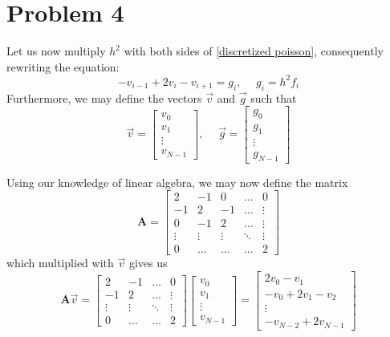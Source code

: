 \documentclass[english,notitlepage]{revtex4-1}  %
\begin{document}
\section*{Problem 4}
Let us now multiply $h^2$ with both sides of \eqref{discretized poisson}, consequently rewriting the equation:
\begin{equation}
    -v_{i-1} + 2v_i - v_{i+1} = g_i, \hspace{15pt} g_i = h^2f_i \label{g_i define}
\end{equation}
Furthermore, we may define the vectors $\vec{v}$ and $\vec{g}$ such that
\begin{equation}
    \vec{v} = \begin{bmatrix}
        v_0 \\
        v_1 \\
        \vdots \\
        v_{N-1}
    \end{bmatrix}, \hspace{15pt} \vec{g} = \begin{bmatrix}
        g_0 \\
        g_1 \\
        \vdots \\
        g_{N-1}
    \end{bmatrix}
\end{equation}

Using our knowledge of linear algebra, we may now define the matrix
\begin{equation}
    \textbf{A} = \begin{bmatrix}
        2 & -1 & 0 & \ldots & 0 \\
        -1 & 2 & -1 & \ldots & \vdots \\
        0 & -1 & 2 & \ldots & \vdots \\
        \vdots&\vdots&\vdots&\ddots & \vdots \\
        0 & \ldots&\ldots & \ldots & 2
    \end{bmatrix}
\end{equation}
which multiplied with $\vec{v}$ gives us
\begin{equation}
    \textbf{A}\vec{v} = \begin{bmatrix}
        2 & -1 & \ldots & 0 \\
        -1 & 2 & \ldots & \vdots \\
        \vdots&\vdots&\ddots&\vdots \\
        0 & \ldots & \ldots & 2
    \end{bmatrix} \begin{bmatrix}
        v_0 \\
        v_1 \\
        \vdots \\
        v_{N-1}
    \end{bmatrix} = \begin{bmatrix}
        2v_0 - v_1 \\
        -v_0 + 2v_1 -v_2 \\
        \vdots\\
        -v_{N-2}+2v_{N-1}
    \end{bmatrix}
\end{equation}
\end{document}
